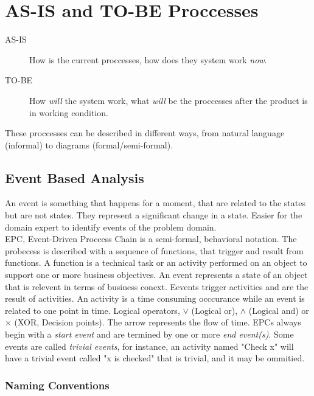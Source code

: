 \documentclass[11pt,a4paper,twocolumn]{book}
\begin{document}
\section{AS-IS and TO-BE Proccesses}

\begin{description}
\item[AS-IS] How is the current proccesses, how does they system work \textit{now}.
\item[TO-BE] How \textit{will} the system work, what \textit{will} be the proccesses after the product is in working condition.
\end{description}

These proccesses can be described in different ways, from natural language (informal) to diagrams (formal/semi-formal).

\subsection{Event Based Analysis}

An event is something that happens for a moment, that are related to the states but are not states. They represent a significant change in a state. Easier for the domain expert to identify events of the problem domain.\\

EPC, Event-Driven Proccess Chain is a semi-formal, behavioral notation. The probecess is described with a sequence of functions, that trigger and result from functions. A function is a technical task or an activity performed on an object to support one or more business objectives. An event represents a state of an object that is relevent in terms of business conext. Eevents trigger activities and are the result of activities. An activity is a time consuming occcurance while an event is related to one point in time. Logical operators, $\lor$ (Logical or), $\land$ (Logical and) or $\times$ (XOR, Decision points). The arrow represents the flow of time. EPCs always begin with a \textit{start event} and are termined by one or more \textit{end event(s)}. Some events are called \textit{trivial events}, for instance, an activity named "Check x" will have a trivial event called "x is checked" that is trivial, and it may be ommitied.\\

\subsubsection{Naming Conventions}
\end{document}
